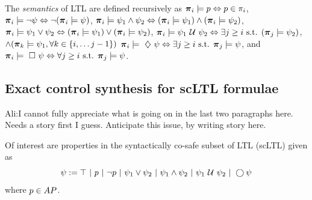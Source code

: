 \documentclass{ifacconf}
\newcommand{\red}[1]{{\color{red} #1}}
\renewcommand{\axx}[1]{{\color{orange} Ali:#1}}
\begin{document}
   
     The {\em semantics} of LTL  are defined recursively as
${\boldsymbol{\pi}}_i \models p   \Leftrightarrow p\in\pi_i$, 
    ${\boldsymbol{\pi}}_i \models \neg \psi  \Leftrightarrow\neg ({\boldsymbol{\pi}}_i \models \psi) $, 
    ${\boldsymbol{\pi}}_i \models \psi_1 \wedge  \psi_2   \Leftrightarrow  ( {\boldsymbol{\pi}}_i \models \psi_1 ) \wedge ( {\boldsymbol{\pi}}_i \models \psi_2 ) $, 
    ${\boldsymbol{\pi}}_i \models \psi_1 \vee  \psi_2   \Leftrightarrow  ( {\boldsymbol{\pi}}_i \models \psi_1 ) \vee ( {\boldsymbol{\pi}}_i \models \psi_2 ) $, 
    ${\boldsymbol{\pi}}_i \models  \psi_1 \ \mathcal{U}\  \psi_2  \Leftrightarrow \exists j \geq i \text{ s.t. } ({\boldsymbol{\pi}}_j \models \psi_2 ) $, 
    $  \wedge ({\boldsymbol{\pi}}_k \models \psi_1, \forall k \in \{i, \ldots j-1\})$
    ${\boldsymbol{\pi}}_i \models \ \diamondsuit\  \psi   \Leftrightarrow \exists j \geq i \text{ s.t. }{\boldsymbol{\pi}}_j \models \psi $, and 
    ${\boldsymbol{\pi}}_i \models \ \square\  \psi   \Leftrightarrow  \forall j \geq i \text{ s.t. }{\boldsymbol{\pi}}_j \models \psi$.


 




\subsection{Exact control synthesis for scLTL formulae}
\axx{I cannot fully appreciate what is going on in the last two paragraphs here. Needs a story first I guess.} \red{Anticipate this issue, by writing story here.}



Of interest are properties in the syntactically co-safe subset of LTL (scLTL) given as
    \begin{equation}\label{eq:scLTL}
     \psi :=  \True \ |\ p \ |\ \notltl p \ |\ \psi_1 \vee\psi_2  \ |\ \psi_1 \andltl \psi_2 \ |\ \psi_1 \Until \psi_2 \ |\ \Next \psi
    \end{equation}     where $p\in AP$.
     
% 
\end{document}
